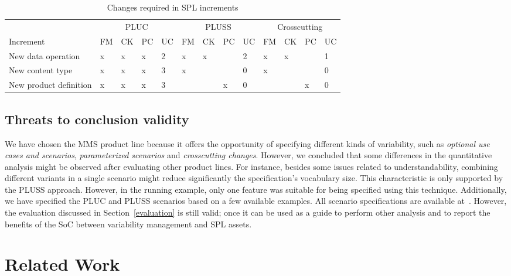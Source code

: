 \documentclass{acm_proc_article-sp}
\begin{document}
\begin{table*}[t]
\centering
\caption{Changes required in SPL increments}
\label{tab:incremental-results}
\begin{small}
\begin{tabular}{l|llll|llll|llll} \hline
& \multicolumn{4}{|c|}{PLUC} & \multicolumn{4}{|c|}{PLUSS}  & \multicolumn{4}{|c}{Crosscutting} \\
Increment 			& FM 	& CK   & PC & UC	& FM 	& CK & PC 	& UC 	& FM 	& CK & PC 	& UC  	\\ \hline
New data operation  	& x		& x	   & x    &	2	& x 		& x 	 & 		& 2		& x		& x	 & 		& 1		\\ 
New content type      	& x 		& x	   & x	    &	3	& x		&	 & 		& 0		& x		& 	 &		& 0		\\
New product definition 	& x 		& x	   & x	    &	3	& 		& 	 & x	 	& 0		& 		& 	 & x		& 0		\\ \hline
\end{tabular}
\end{small}
\end{table*}
  
\subsection{Threats to conclusion validity}
\label{threats}

We have chosen the MMS product line because it offers the opportunity of specifying different kinds 
of variability, such as \emph{optional use cases and scenarios}, \emph{parameterized scenarios} and 
\emph{crosscutting changes}. However, we concluded that some differences in the quantitative 
analysis might be observed after evaluating other product lines. For instance, besides some issues related 
to understandability, combining different variants in a single scenario might reduce significantly the  
specification's vocabulary size. This characteristic is only supported by the PLUSS approach. However, in 
the running example, only one feature was suitable for being specified using this technique.  
Additionally, we have specified the PLUC and PLUSS scenarios based on a few available examples. All scenario specifications are available at~\cite{spg-url}. However, the evaluation discussed in Section~\ref{evaluation} is
still valid; once it can be used as a guide to perform other analysis and to report the benefits of the SoC between variability management and SPL assets. 

\section{Related Work}
\label{related-work}
\end{document}
